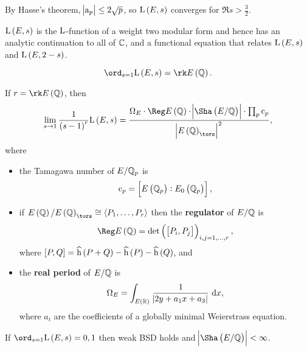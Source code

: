 By Hasse's theorem, $ \abs{\mathrm{a}_p} \le 2\sqrt{p} $, so $ \L\br{E, s} $ converges for $ \Re s > \tfrac{3}{2} $.

\begin{theorem}
$ \L\br{E, s} $ is the $ \mathrm{L} $-function of a weight two modular form and hence has an analytic continuation to all of $ \mathbb{C} $, and a functional equation that relates $ \L\br{E, s} $ and $ \L\br{E, 2 - s} $.
\end{theorem}

\begin{theorem}
$$ \ord_{s = 1} \L\br{E, s} = \rk E\br{\QQ}. $$
\end{theorem}

\begin{theorem}
If $ r = \rk E\br{\QQ} $, then
$$ \lim_{s \to 1} \dfrac{1}{\br{s - 1}^r}\L\br{E, s} = \dfrac{\Omega_E \cdot \Reg E\br{\QQ} \cdot \abs{\Sha\br{E / \QQ}} \cdot \prod_p \c_p}{\abs{E\br{\QQ}_{\tors}}^2}, $$
where
\begin{itemize}
\item the Tamagawa number of $ E / \mathbb{Q}_p $ is
$$ \c_p = \sbr{E\br{\QQ_p} : E_0\br{\QQ_p}}, $$
\item if $ E\br{\QQ} / E\br{\QQ}_{\tors} \cong \abr{P_1, \dots, P_r} $ then the \textbf{regulator} of $ E / \mathbb{Q} $ is
$$ \Reg E\br{\QQ} = \det \br{\sbr{P_i, P_j}}_{i, j = 1, \dots, r}, $$
where $ \sbr{P, Q} = \widehat{\h}\br{P + Q} - \widehat{\h}\br{P} - \widehat{\h}\br{Q} $, and
\item the \textbf{real period} of $ E / \mathbb{Q} $ is
$$ \Omega_E = \intd{E\br{\RR}}{}{\dfrac{1}{\abs{2y + a_1x + a_3}}}{x}, $$
where $ a_i $ are the coefficients of a globally minimal Weierstrass equation.
\end{itemize}
\end{theorem}

\begin{theorem}[Kolyvagin]
If $ \ord_{s = 1} \L\br{E, s} = 0, 1 $ then weak BSD holds and $ \abs{\Sha\br{E / \QQ}} < \infty $.
\end{theorem}

